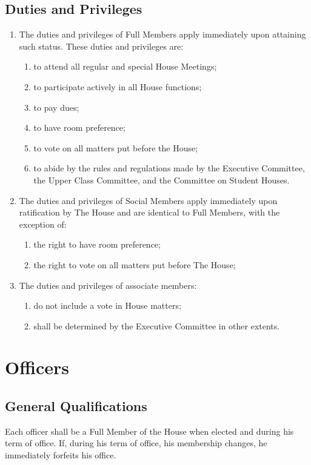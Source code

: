 \documentclass[10pt]{article} %
\begin{document}
\subsection{Duties and Privileges}
\begin{enumerate}
\item The duties and privileges of Full Members apply immediately upon attaining such status. These duties and privileges are:
\begin{enumerate}
\item to attend all regular and special House Meetings;
\item to participate actively in all House functions;
\item to pay dues;
\item to have room preference;
\item to vote on all matters put before the House;
\item to abide by the rules and regulations made by the Executive Committee, the Upper Class Committee, and the Committee on Student Houses.
\end{enumerate}
\item The duties and privileges of Social Members apply immediately upon ratification by The House and are identical to Full Members, with the exception of:
\begin{enumerate}
\item the right to have room preference;
\item the right to vote on all matters put before The House;
\end{enumerate}
\item The duties and privileges of associate members:
\begin{enumerate}
\item do not include a vote in House matters;
\item shall be determined by the Executive Committee in other extents.
\end{enumerate}
\end{enumerate}
\section{Officers}
\subsection{General Qualifications}
Each officer shall be a Full Member of the House when elected and during his term of office. If, during his term of office, his membership changes, he immediately forfeits his office.
\end{document}
